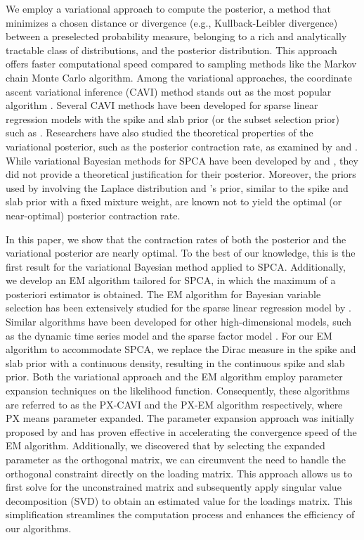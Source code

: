 \documentclass[pdftex, noinfoline, letter]{imsart}
\theoremstyle{plain}
\begin{document}
We employ a variational approach to compute the posterior, a method that minimizes a chosen distance or divergence (e.g., Kullback-Leibler divergence) between a preselected probability measure, belonging to a rich and analytically tractable class of distributions, and the posterior distribution. This approach offers faster computational speed compared to sampling methods like the Markov chain Monte Carlo algorithm. Among the variational approaches, the coordinate ascent variational inference (CAVI) method stands out as the most popular algorithm \citep{blei17}.
 Several CAVI methods have been developed for sparse linear regression models with the spike and slab prior (or the subset selection prior) such as \cite{carbonetto12, huang16, ray20, yang20}. Researchers have also studied the theoretical properties of the variational posterior, such as the posterior contraction rate, as examined by \citet{ray20} and \citet{yang20}.
While variational Bayesian methods for SPCA have been developed by \citet{guan09} and \citet{bouveyron18}, they did not provide a theoretical justification for their posterior. Moreover, the priors used by \citet{guan09} involving the Laplace distribution and \citet{bouveyron18}'s prior, similar to the spike and slab prior with a fixed mixture weight, are known not to yield the optimal (or near-optimal) posterior contraction rate.

In this paper, we show that the contraction rates of both the posterior and the variational posterior are nearly optimal. To the best of our knowledge, this is the first result for the variational Bayesian method applied to SPCA.
Additionally, we develop an EM algorithm tailored for SPCA,  in which the maximum of a posteriori estimator is obtained. The EM algorithm for Bayesian variable selection has been extensively studied for the sparse linear regression model by \citet{rockova14b,rockova18a}. Similar algorithms have been developed for other high-dimensional models, such as the dynamic time series model \citep{ning19} and the sparse factor model \citep{rockova16}. For our EM algorithm to accommodate SPCA, we replace the Dirac measure in the spike and slab prior with a continuous density, resulting in the continuous spike and slab prior.
Both the variational approach and the EM algorithm employ parameter expansion techniques on the likelihood function. Consequently, these algorithms are referred to as the PX-CAVI and the PX-EM algorithm respectively, where PX means parameter expanded. The parameter expansion approach was initially proposed by \citet{liu98} and has proven effective in accelerating the convergence speed of the EM algorithm. Additionally, we discovered that by selecting the expanded parameter as the orthogonal matrix, we can circumvent the need to handle the orthogonal constraint directly on the loading matrix. This approach allows us to first solve for the unconstrained matrix and subsequently apply singular value decomposition (SVD) to obtain an estimated value for the loadings matrix. This simplification streamlines the computation process and enhances the efficiency of our algorithms.
\end{document}
